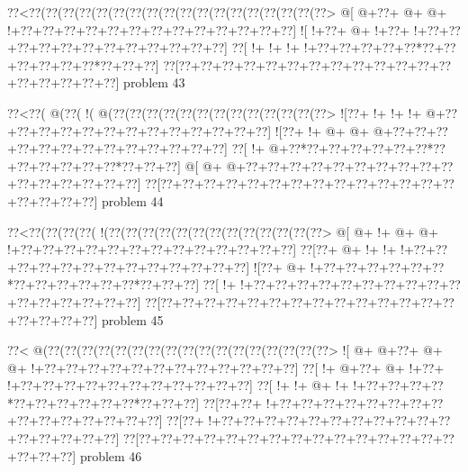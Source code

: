 \vbox{\vbox{\goo
\0??<\0??(\0??(\0??(\0??(\0??(\0??(\0??(\0??(\0??(\0??(\0??(\0??(\0??(\0??(\0??(\0??(\0??(\0??>
\- @[\- @+\0??+\- @+\- @+\- !+\0??+\0??+\0??+\0??+\0??+\0??+\0??+\0??+\0??+\0??+\0??+\0??+\0??]
\- ![\- !+\0??+\- @+\- !+\0??+\- !+\0??+\0??+\0??+\0??+\0??+\0??+\0??+\0??+\0??+\0??+\0??+\0??]
\0??[\- !+\- !+\- !+\- !+\0??+\0??+\0??+\0??+\0??*\0??+\0??+\0??+\0??+\0??+\0??*\0??+\0??+\0??]
\0??[\0??+\0??+\0??+\0??+\0??+\0??+\0??+\0??+\0??+\0??+\0??+\0??+\0??+\0??+\0??+\0??+\0??+\0??]
}
\hfil problem 43\hfil\break
}



\vbox{\vbox{\goo
\0??<\0??(\- @(\0??(\- !(\- @(\0??(\0??(\0??(\0??(\0??(\0??(\0??(\0??(\0??(\0??(\0??(\0??(\0??>
\- ![\0??+\- !+\- !+\- !+\- @+\0??+\0??+\0??+\0??+\0??+\0??+\0??+\0??+\0??+\0??+\0??+\0??+\0??]
\- ![\0??+\- !+\- @+\- @+\- @+\0??+\0??+\0??+\0??+\0??+\0??+\0??+\0??+\0??+\0??+\0??+\0??+\0??]
\0??[\- !+\- @+\0??*\0??+\0??+\0??+\0??+\0??+\0??*\0??+\0??+\0??+\0??+\0??+\0??*\0??+\0??+\0??]
\- @[\- @+\- @+\0??+\0??+\0??+\0??+\0??+\0??+\0??+\0??+\0??+\0??+\0??+\0??+\0??+\0??+\0??+\0??]
\0??[\0??+\0??+\0??+\0??+\0??+\0??+\0??+\0??+\0??+\0??+\0??+\0??+\0??+\0??+\0??+\0??+\0??+\0??]
}
\hfil problem 44\hfil\break
}



\vbox{\vbox{\goo
\0??<\0??(\0??(\0??(\0??(\- !(\0??(\0??(\0??(\0??(\0??(\0??(\0??(\0??(\0??(\0??(\0??(\0??(\0??>
\- @[\- @+\- !+\- @+\- @+\- !+\0??+\0??+\0??+\0??+\0??+\0??+\0??+\0??+\0??+\0??+\0??+\0??+\0??]
\0??[\0??+\- @+\- !+\- !+\- !+\0??+\0??+\0??+\0??+\0??+\0??+\0??+\0??+\0??+\0??+\0??+\0??+\0??]
\- ![\0??+\- @+\- !+\0??+\0??+\0??+\0??+\0??+\0??*\0??+\0??+\0??+\0??+\0??+\0??*\0??+\0??+\0??]
\0??[\- !+\- !+\0??+\0??+\0??+\0??+\0??+\0??+\0??+\0??+\0??+\0??+\0??+\0??+\0??+\0??+\0??+\0??]
\0??[\0??+\0??+\0??+\0??+\0??+\0??+\0??+\0??+\0??+\0??+\0??+\0??+\0??+\0??+\0??+\0??+\0??+\0??]
}
\hfil problem 45\hfil\break
}



\vbox{\vbox{\goo
\0??<\- @(\0??(\0??(\0??(\0??(\0??(\0??(\0??(\0??(\0??(\0??(\0??(\0??(\0??(\0??(\0??(\0??(\0??>
\- ![\- @+\- @+\0??+\- @+\- @+\- !+\0??+\0??+\0??+\0??+\0??+\0??+\0??+\0??+\0??+\0??+\0??+\0??]
\0??[\- !+\- @+\0??+\- @+\- !+\0??+\- !+\0??+\0??+\0??+\0??+\0??+\0??+\0??+\0??+\0??+\0??+\0??]
\0??[\- !+\- !+\- @+\- !+\- !+\0??+\0??+\0??+\0??*\0??+\0??+\0??+\0??+\0??+\0??*\0??+\0??+\0??]
\0??[\0??+\0??+\- !+\0??+\0??+\0??+\0??+\0??+\0??+\0??+\0??+\0??+\0??+\0??+\0??+\0??+\0??+\0??]
\0??[\0??+\- !+\0??+\0??+\0??+\0??+\0??+\0??+\0??+\0??+\0??+\0??+\0??+\0??+\0??+\0??+\0??+\0??]
\0??[\0??+\0??+\0??+\0??+\0??+\0??+\0??+\0??+\0??+\0??+\0??+\0??+\0??+\0??+\0??+\0??+\0??+\0??]
}
\hfil problem 46\hfil\break
}



